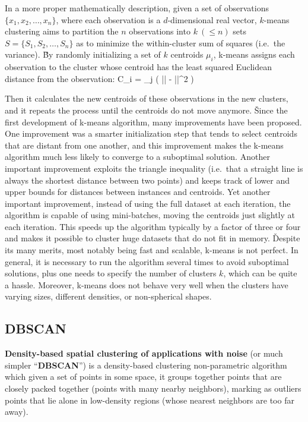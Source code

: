 
In a more proper mathematically description, given a set of observations $\{ x_1, x_2, \ldots, x_n \}$, where each 
observation is a $d$-dimensional real vector, $k$-means clustering aims to partition the $n$ observations into $k \:
(\leq n)$ sets $S = \{ S_1, S_2, \ldots, S_n \}$ as to minimize the within-cluster sum of squares (i.e.\ the
variance). \v

By randomly initializing a set of $k$ centroids $\mu_i$, k-means assigns each observation to the cluster whose 
centroid has the least squared Euclidean distance from the observation:
\bse
C_i = \argmin_{j} \left( ||  -  ||^2 \right)
\ese

Then it calculates the new centroids of these observations in the new clusters, and it repeats the process until the 
centroids do not move anymore. \v

Since the first development of k-means algorithm, many improvements have been proposed. One improvement was a 
smarter initialization step that tends to select centroids that are distant from one another, and this improvement 
makes the k-means algorithm much less likely to converge to a suboptimal solution. Another important improvement 
exploits the triangle inequality (i.e.\ that a straight line is always the shortest distance between two points) and 
keeps track of lower and upper bounds for distances between instances and centroids. Yet another important 
improvement, instead of using the full dataset at each iteration, the algorithm is capable of using mini-batches, 
moving the centroids just slightly at each iteration. This speeds up the algorithm typically by a factor of three or 
four and makes it possible to cluster huge datasets that do not fit in memory. \v

Despite its many merits, most notably being fast and scalable, k-means is not perfect. In general, it is necessary
to run the algorithm several times to avoid suboptimal solutions, plus one needs to specify the number of clusters 
$k$, which can be quite a hassle. Moreover, k-means does not behave very well when the clusters have varying sizes,
different densities, or non-spherical shapes.

\subsection{DBSCAN}

\bd[DBSCAN]
\textbf{Density-based spatial clustering of applications with noise} (or much simpler ``\textbf{DBSCAN}'') is a
density-based clustering non-parametric algorithm which given a set of points in some space, it groups together 
points that are closely packed together (points with many nearby neighbors), marking as outliers points that lie 
alone in low-density regions (whose nearest neighbors are too far away).
\ed

